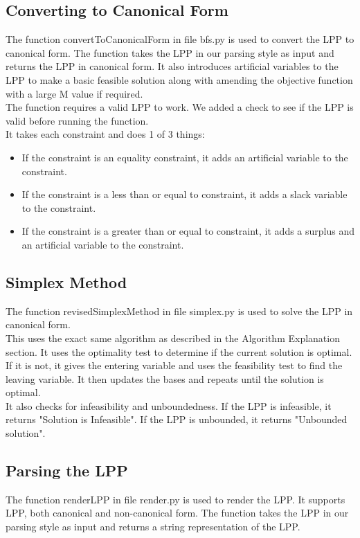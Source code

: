 \documentclass{article}
\numberwithin{equation}{section}
\begin{document}
\subsection{Converting to Canonical Form}
The function convertToCanonicalForm in file bfs.py is used to convert the LPP to canonical form. The function takes the LPP in our parsing style as input and returns the LPP in canonical form. It also introduces artificial variables to the LPP to make a basic feasible solution along with amending the objective function with a large M value if required.\\
The function requires a valid LPP to work. We added a check to see if the LPP is valid before running the function.\\
It takes each constraint and does 1 of 3 things:
\begin{itemize}
    \item If the constraint is an equality constraint, it adds an artificial variable to the constraint.
    \item If the constraint is a less than or equal to constraint, it adds a slack variable to the constraint.
    \item If the constraint is a greater than or equal to constraint, it adds a surplus and an artificial variable to the constraint.
\end{itemize}

\subsection{Simplex Method}
The function revisedSimplexMethod in file simplex.py is used to solve the LPP in canonical form.\\ 
This uses the exact same algorithm as described in the Algorithm Explanation section. It uses the optimality test to determine if the current solution is optimal. If it is not, it gives the entering variable and uses the feasibility test to find the leaving variable. It then updates the bases and repeats until the solution is optimal.\\
It also checks for infeasibility and unboundedness. If the LPP is infeasible, it returns "Solution is Infeasible". If the LPP is unbounded, it returns "Unbounded solution".

\subsection{Parsing the LPP}
The function renderLPP in file render.py is used to render the LPP. It supports LPP, both canonical and non-canonical form. The function takes the LPP in our parsing style as input and returns a string representation of the LPP.
\end{document}
